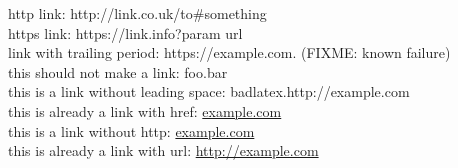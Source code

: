 \documentclass{article}
\begin{document}
  http link: http://link.co.uk/to\#something \\
  https link: https://link.info?param url \\
  link with trailing period: https://example.com. (FIXME: known failure) \\
  this should not make a link: foo.bar \\
  this is a link without leading space: badlatex.http://example.com \\
  this is already a link with href: \href{http://example.com}{example.com} \\
  this is a link without http: \href{example.com}{example.com} \\
  this is already a link with url: \url{http://example.com} \\
\end{document}

